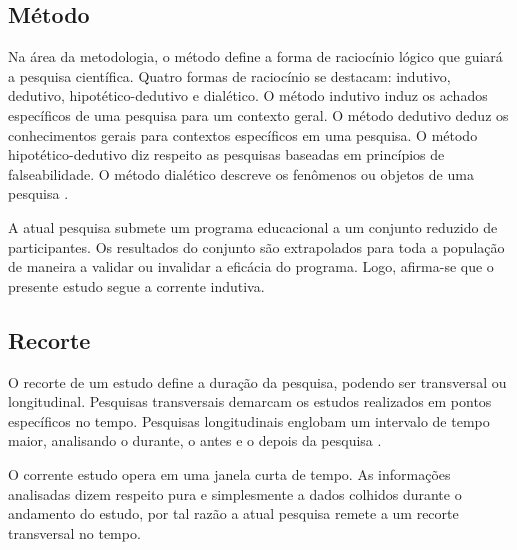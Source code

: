 \subsection{Método}\label{sub:metodo}



Na área da metodologia, o método define a forma de raciocínio lógico que guiará a pesquisa científica. Quatro formas de raciocínio se destacam: indutivo, dedutivo, hipotético-dedutivo e dialético. O método indutivo induz os achados específicos de uma pesquisa para um contexto geral. O método dedutivo deduz os conhecimentos gerais para contextos específicos em uma pesquisa. O método hipotético-dedutivo diz respeito as pesquisas baseadas em princípios de falseabilidade. O método dialético descreve os fenômenos ou objetos de uma pesquisa \cite{marconi2003lakatos}.  

A atual pesquisa submete um programa educacional a um conjunto reduzido de participantes. Os resultados do conjunto são extrapolados para toda a população de maneira a validar ou invalidar a eficácia do programa. Logo, afirma-se que o presente estudo segue a corrente indutiva. 


\subsection{Recorte}\label{sub:recorte}

\vspace{-0.14cm}



O recorte de um estudo define a duração da pesquisa, podendo ser transversal ou longitudinal. Pesquisas transversais demarcam os estudos realizados em pontos específicos no tempo. Pesquisas longitudinais englobam um intervalo de tempo maior, analisando o durante, o antes e o depois da pesquisa \cite{hochman2005desenhos}. 

O corrente estudo opera em uma janela curta de tempo. As informações analisadas dizem respeito pura e simplesmente a dados colhidos durante o andamento do estudo, por tal razão a atual pesquisa remete a um recorte transversal no tempo. 










\vspace{-0.3cm}


